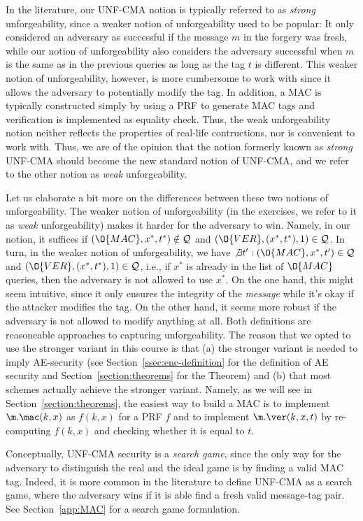 \begin{remark}
  In the literature, our UNF-CMA notion is typically referred to as \emph{strong} unforgeability, since a weaker notion of unforgeability used to be popular: It only considered an adversary as successful if the message $m$ in the forgery was fresh, while our notion of unforgeability also considers the adversary successful when $m$ is the same as in the previous queries as long as the tag $t$ is different. This weaker notion of unforgeability, however, is more cumbersome to work with since it allows the adversary to potentially modify the tag. In addition, a MAC is typically constructed simply by using a PRF to generate MAC tags and verification is implemented as equality check. Thus, the weak unforgeability notion neither reflects the properties of real-life contructions, nor is convenient to work with. Thus, we are of the opinion that the notion formerly known as \emph{strong} UNF-CMA should become the new standard notion of UNF-CMA, and we refer to the other notion as \emph{weak} unforgeability.

Let us elaborate a bit more on the differences between these two notions of unforgeability. The weaker notion of unforgeability (in the exercises, we refer to it as \emph{weak} unforgeability) makes it harder for the adversary to win. Namely, in our notion, it suffices if $(\O{MAC}, x^*,t^*)\notin \mathcal{Q}$ and $(\O{VER}, (x^*,t^*),1)\in \mathcal{Q}$. In turn, in the weaker notion
  of unforgeability, we have $\not\exists t':(\O{MAC}, x^*,t')\in \mathcal{Q}$ and $(\O{VER}, (x^*,t^*),1)\in \mathcal{Q}$,
  i.e., if $x^*$ is already in the list of $\O{MAC}$ queries, then the adversary is not allowed to use $x^*$. On the one
  hand, this might seem intuitive, since it only ensures the integrity of the \emph{message} while it's okay if the attacker
  modifies the tag. On the other hand, it seems more robust if the adversary is not allowed to modify anything at all.
  Both definitions are reasoneable approaches to capturing unforgeability. The reason that we opted to use the
  stronger variant in this course is that (a) the stronger variant is needed to imply AE-security (see Section~\ref{ssec:enc-definition} for the definition of AE security and Section~\ref{section:theorems} for the Theorem) and (b) that most schemes actually achieve the stronger variant. Namely, as we will see in Section~\ref{section:theorems}, the easiest way to build a MAC
  is to implement $\m.\mac(k,x)$ as $f(k,x)$ for a PRF $f$ and to implement $\m.\ver(k,x,t)$ by re-computing $f(k,x)$ and
  checking whether it is equal to $t$.
\end{remark}

\begin{remark}
  Conceptually, UNF-CMA security is a \emph{search game}, since the only way for the adversary to distinguish the real and the ideal game is by finding a valid MAC tag. Indeed, it is more common in the literature to define UNF-CMA as a search game, where the adversary wins if it is able find a fresh valid message-tag pair. See Section~\ref{app:MAC} for a search game formulation.
\end{remark}

